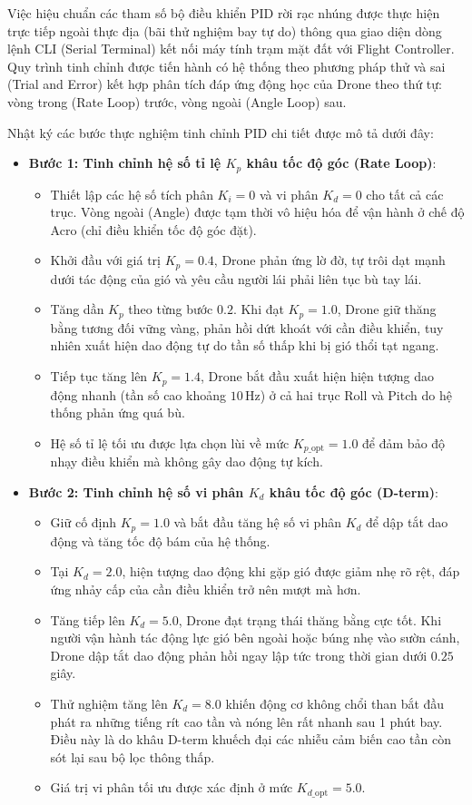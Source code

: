 Việc hiệu chuẩn các tham số bộ điều khiển PID rời rạc nhúng được thực hiện trực tiếp ngoài thực địa (bãi thử nghiệm bay tự do) thông qua giao diện dòng lệnh CLI (Serial Terminal) kết nối máy tính trạm mặt đất với Flight Controller. Quy trình tinh chỉnh được tiến hành có hệ thống theo phương pháp thử và sai (Trial and Error) kết hợp phân tích đáp ứng động học của Drone theo thứ tự: vòng trong (Rate Loop) trước, vòng ngoài (Angle Loop) sau.

Nhật ký các bước thực nghiệm tinh chỉnh PID chi tiết được mô tả dưới đây:
\begin{itemize}
    \item \textbf{Bước 1: Tinh chỉnh hệ số tỉ lệ $K_p$ khâu tốc độ góc (Rate Loop)}:
    \begin{itemize}
        \item Thiết lập các hệ số tích phân $K_i = 0$ và vi phân $K_d = 0$ cho tất cả các trục. Vòng ngoài (Angle) được tạm thời vô hiệu hóa để vận hành ở chế độ Acro (chỉ điều khiển tốc độ góc đặt).
        \item Khởi đầu với giá trị $K_p = 0.4$, Drone phản ứng lờ đờ, tự trôi dạt mạnh dưới tác động của gió và yêu cầu người lái phải liên tục bù tay lái.
        \item Tăng dần $K_p$ theo từng bước $0.2$. Khi đạt $K_p = 1.0$, Drone giữ thăng bằng tương đối vững vàng, phản hồi dứt khoát với cần điều khiển, tuy nhiên xuất hiện dao động tự do tần số thấp khi bị gió thổi tạt ngang.
        \item Tiếp tục tăng lên $K_p = 1.4$, Drone bắt đầu xuất hiện hiện tượng dao động nhanh (tần số cao khoảng $10\,\text{Hz}$) ở cả hai trục Roll và Pitch do hệ thống phản ứng quá bù.
        \item Hệ số tỉ lệ tối ưu được lựa chọn lùi về mức $K_{p\_\text{opt}} = 1.0$ để đảm bảo độ nhạy điều khiển mà không gây dao động tự kích.
    \end{itemize}

    \item \textbf{Bước 2: Tinh chỉnh hệ số vi phân $K_d$ khâu tốc độ góc (D-term)}:
    \begin{itemize}
        \item Giữ cố định $K_p = 1.0$ và bắt đầu tăng hệ số vi phân $K_d$ để dập tắt dao động và tăng tốc độ bám của hệ thống.
        \item Tại $K_d = 2.0$, hiện tượng dao động khi gặp gió được giảm nhẹ rõ rệt, đáp ứng nhảy cấp của cần điều khiển trở nên mượt mà hơn.
        \item Tăng tiếp lên $K_d = 5.0$, Drone đạt trạng thái thăng bằng cực tốt. Khi người vận hành tác động lực gió bên ngoài hoặc búng nhẹ vào sườn cánh, Drone dập tắt dao động phản hồi ngay lập tức trong thời gian dưới $0.25$ giây.
        \item Thử nghiệm tăng lên $K_d = 8.0$ khiến động cơ không chổi than bắt đầu phát ra những tiếng rít cao tần và nóng lên rất nhanh sau 1 phút bay. Điều này là do khâu D-term khuếch đại các nhiễu cảm biến cao tần còn sót lại sau bộ lọc thông thấp.
        \item Giá trị vi phân tối ưu được xác định ở mức $K_{d\_\text{opt}} = 5.0$.
    \end{itemize}


\end{itemize}
